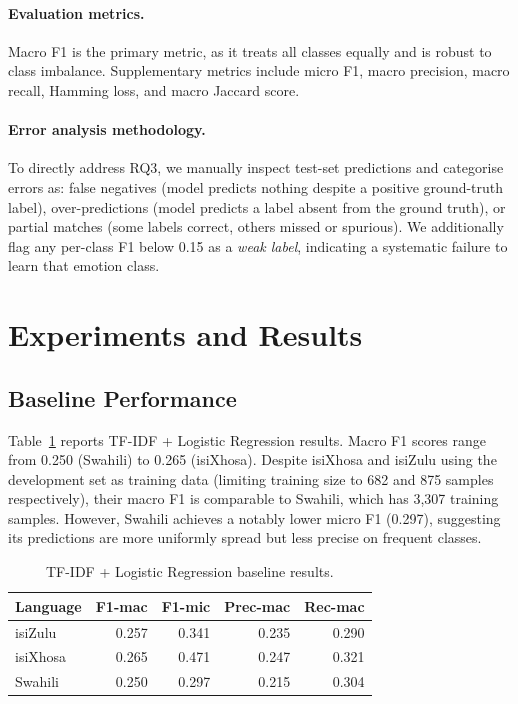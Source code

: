 \documentclass[11pt]{article}
\begin{document}
\paragraph{Evaluation metrics.}
Macro F1 is the primary metric, as it treats all classes equally and is robust
to class imbalance.
Supplementary metrics include micro F1, macro precision, macro recall,
Hamming loss, and macro Jaccard score.

\paragraph{Error analysis methodology.}
To directly address RQ3, we manually inspect test-set predictions and
categorise errors as: false negatives (model predicts nothing despite a
positive ground-truth label), over-predictions (model predicts a label
absent from the ground truth), or partial matches (some labels correct,
others missed or spurious).
We additionally flag any per-class F1 below 0.15 as a \textit{weak label},
indicating a systematic failure to learn that emotion class.

\section{Experiments and Results}

\subsection{Baseline Performance}

Table~\ref{tab:baseline} reports TF-IDF + Logistic Regression results.
Macro F1 scores range from 0.250 (Swahili) to 0.265 (isiXhosa).
Despite isiXhosa and isiZulu using the development set as training data
(limiting training size to 682 and 875 samples respectively), their macro F1
is comparable to Swahili, which has 3{,}307 training samples.
However, Swahili achieves a notably lower micro F1 (0.297), suggesting its
predictions are more uniformly spread but less precise on frequent classes.

\begin{table}[h]
\centering
\small
\begin{tabular}{lrrrr}
\toprule
\textbf{Language} & \textbf{F1-mac} & \textbf{F1-mic} & \textbf{Prec-mac} &
  \textbf{Rec-mac} \\
\midrule
isiZulu  & 0.257 & 0.341 & 0.235 & 0.290 \\
isiXhosa & 0.265 & 0.471 & 0.247 & 0.321 \\
Swahili  & 0.250 & 0.297 & 0.215 & 0.304 \\
\bottomrule
\end{tabular}
\caption{TF-IDF + Logistic Regression baseline results.}
\label{tab:baseline}
\end{table}
\end{document}
